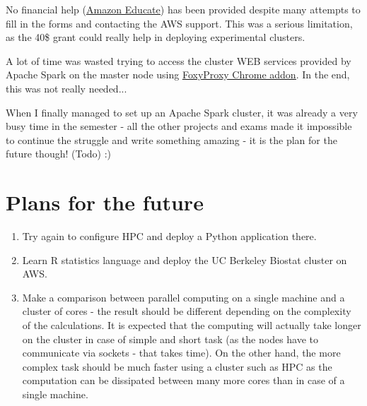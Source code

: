 \documentclass{customization}
\begin{document}
\vspace{0.7cm}
\noindent
No financial help (\underline{\href{https://aws.amazon.com/education/awseducate/}{Amazon Educate}}) has been provided despite many attempts to fill in the forms and contacting the AWS support. This was a serious limitation, as the 40\$ grant could really help in deploying experimental clusters.

\vspace{0.7cm}
\noindent
A lot of time was wasted trying to access the cluster WEB services provided by Apache Spark on the master node using \underline{\href{https://chrome.google.com/webstore/detail/foxyproxy-standard/gcknhkkoolaabfmlnjonogaaifnjlfnp?hl=en}{FoxyProxy Chrome addon}}. In the end, this was not really needed...

\vspace{0.7cm}
\noindent
When I finally managed to set up an Apache Spark cluster, it was already a very busy time in the semester - all the other projects and exams made it impossible to continue the struggle and write something amazing - it is the plan for the future though! (Todo) :)

\section{Plans for the future}
\begin{enumerate}
    \item Try again to configure HPC and deploy a Python application there.
    \item Learn R statistics language and deploy the UC Berkeley Biostat cluster on AWS.
    \item Make a comparison between parallel computing on a single machine and a cluster of cores - the result should be different depending on the complexity of the calculations. It is expected that the computing will actually take longer on the cluster in case of simple and short task (as the nodes have to communicate via sockets - that takes time). On the other hand, the more complex task should be much faster using a cluster such as HPC as the computation can be dissipated between many more cores than in case of a single machine.
\end{enumerate}
 
\end{document}
